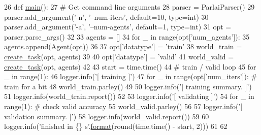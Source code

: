 \begin{DoxyCode}
26 \textcolor{keyword}{def }\hyperlink{namespacebase__train_afacf60925509c7e52f77f41e331261f3}{main}():
27     \textcolor{comment}{# Get command line arguments}
28     parser = ParlaiParser()
29     parser.add\_argument(\textcolor{stringliteral}{'-n'}, \textcolor{stringliteral}{'--num-iters'}, default=10, type=int)
30     parser.add\_argument(\textcolor{stringliteral}{'-a'}, \textcolor{stringliteral}{'--num-agents'}, default=1, type=int)
31     opt = parser.parse\_args()
32 
33     agents = []
34     \textcolor{keywordflow}{for} \_ \textcolor{keywordflow}{in} range(opt[\textcolor{stringliteral}{'num\_agents'}]):
35         agents.append(Agent(opt))
36 
37     opt[\textcolor{stringliteral}{'datatype'}] = \textcolor{stringliteral}{'train'}
38     world\_train = \hyperlink{namespaceparlai_1_1core_1_1worlds_a11923c10b545c7ecc1b08fe2242d9c2c}{create\_task}(opt, agents)
39 
40     opt[\textcolor{stringliteral}{'datatype'}] = \textcolor{stringliteral}{'valid'}
41     world\_valid = \hyperlink{namespaceparlai_1_1core_1_1worlds_a11923c10b545c7ecc1b08fe2242d9c2c}{create\_task}(opt, agents)
42 
43     start = time.time()
44     \textcolor{comment}{# train / valid loop}
45     \textcolor{keywordflow}{for} \_ \textcolor{keywordflow}{in} range(1):
46         logger.info(\textcolor{stringliteral}{'[ training ]'})
47         \textcolor{keywordflow}{for} \_ \textcolor{keywordflow}{in} range(opt[\textcolor{stringliteral}{'num\_iters'}]):  \textcolor{comment}{# train for a bit}
48             world\_train.parley()
49 
50         logger.info(\textcolor{stringliteral}{'[ training summary. ]'})
51         logger.info(world\_train.report())
52 
53         logger.info(\textcolor{stringliteral}{'[ validating ]'})
54         \textcolor{keywordflow}{for} \_ \textcolor{keywordflow}{in} range(1):  \textcolor{comment}{# check valid accuracy}
55             world\_valid.parley()
56 
57         logger.info(\textcolor{stringliteral}{'[ validation summary. ]'})
58         logger.info(world\_valid.report())
59 
60     logger.info(\textcolor{stringliteral}{'finished in \{\} s'}.\hyperlink{namespaceparlai_1_1chat__service_1_1services_1_1messenger_1_1shared__utils_a32e2e2022b824fbaf80c747160b52a76}{format}(round(time.time() - start, 2)))
61 
62 
\end{DoxyCode}
